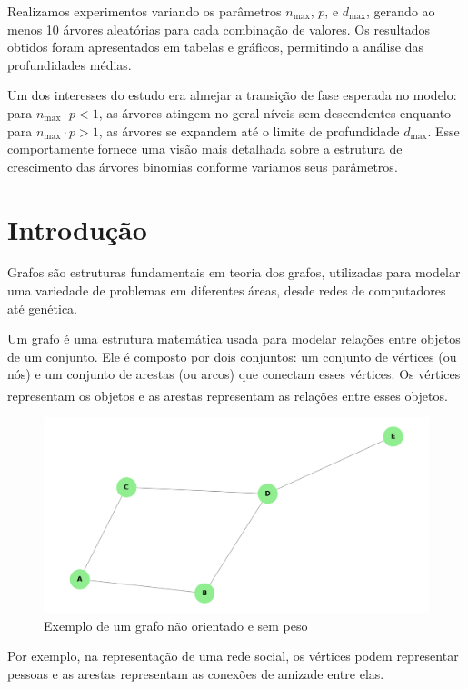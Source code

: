 \documentclass[12pt, a4paper]{scrreprt}
\begin{document}
Realizamos experimentos variando os parâmetros \( n_{\text{max}} \), \( p \), e \( d_{\text{max}} \), gerando ao menos 10 árvores aleatórias para cada combinação de valores. Os resultados obtidos foram apresentados em tabelas e gráficos, permitindo a análise das profundidades médias.

Um dos interesses do estudo era almejar a transição de fase esperada no modelo: para \( n_{\text{max}} \cdot p < 1 \), as árvores atingem no geral níveis sem descendentes enquanto para \( n_{\text{max}} \cdot p > 1 \), as árvores se expandem até o limite de profundidade \( d_{\text{max}} \). Esse comportamente fornece uma visão mais detalhada sobre a estrutura de crescimento das árvores binomias conforme variamos seus parâmetros.

\chapter{Introdução}

Grafos são estruturas fundamentais em teoria dos grafos, utilizadas para modelar uma variedade de problemas em diferentes áreas, desde redes de computadores até genética.

Um grafo é uma estrutura matemática usada para modelar relações entre objetos de um conjunto. Ele é composto por dois conjuntos: um conjunto de vértices (ou nós) e um conjunto de arestas (ou arcos) que conectam esses vértices. Os vértices representam os objetos e as arestas representam as relações entre esses objetos. \textsuperscript{\cite{emilio2024grafos}}

\begin{figure}[h]
    \centering
    \includegraphics[width=.75\textwidth]{src/exemplo_simples_grafo.png}
    \caption{Exemplo de um grafo não orientado e sem peso}
    \label{fig:exemplo de grafo simples}
\end{figure}

Por exemplo, na representação de uma rede social, os vértices podem representar pessoas e as arestas representam as conexões de amizade entre elas.
\end{document}
